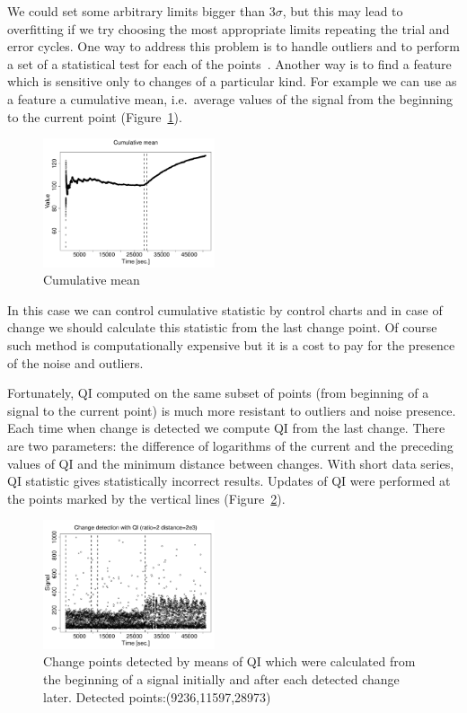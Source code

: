 We could set some arbitrary limits bigger than $3\sigma$, but this may lead to overfitting if we try choosing the most appropriate limits repeating the trial and error cycles.
One way to address this problem is to handle outliers and to perform a set of a statistical test for each of the points~\cite{BakkerSensorsKDD09}.
Another way is to find a feature which is sensitive only to changes of a particular kind.
For example we can use as a feature a cumulative mean, i.e.\ average values of the signal from the beginning to the current point (Figure~\ref{figure21}).

\begin{figure}[htb!]
\includegraphics[width=0.45\textwidth]{pics/cfb_paper/OMF/OMFcumulativemean}
\caption{Cumulative mean}\label{figure21}
\end{figure}

In this case we can control cumulative statistic by control charts and in case of change we should calculate
this statistic from the last change point. Of course such method is computationally expensive but it is a cost to pay for the presence of the
noise and outliers.

Fortunately, QI computed on the same subset of points (from beginning of a signal to the current point) is much more resistant to outliers and noise presence.
Each time when change is detected we compute QI from the last change.
There are two parameters: the difference of logarithms of the current and the preceding values of QI and the minimum distance between changes.
With short data series, QI statistic gives statistically incorrect results.
Updates of QI were performed at the points marked by the vertical lines (Figure~\ref{figure22}).

\begin{figure}[htb!]
\includegraphics[width=0.45\textwidth]{pics/cfb_paper/OMF/OMFsteadyQI1}
\caption{Change points detected by means of QI which were calculated from the beginning of a signal initially and
after each detected change later. Detected points:(9236,11597,28973)}
\label{figure22}
\end{figure}


